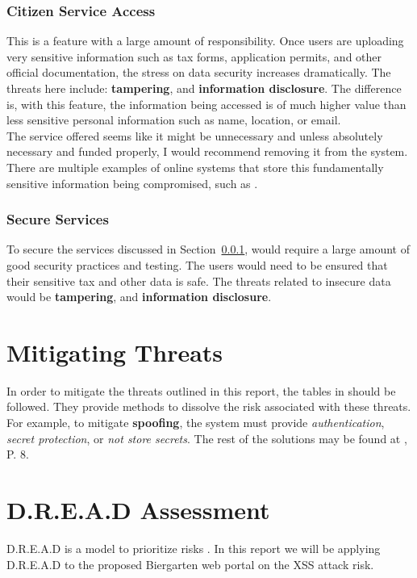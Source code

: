 \documentclass{article}
\numberwithin{equation}{section} %
\numberwithin{figure}{section} %
\numberwithin{table}{section} %
\begin{document}
\subsubsection{Citizen Service Access}
\label{sec:services}
This is a feature with a large amount of responsibility.  Once users are uploading very sensitive information such as tax forms, application permits, and other official documentation, the stress on data security increases dramatically.  The threats here include: \textbf{tampering}, and \textbf{information disclosure}.  The difference is, with this feature, the information being accessed is of much higher value than less sensitive personal information such as name, location, or email.  \\

The service offered seems like it might be unnecessary and unless absolutely necessary and funded properly, I would recommend removing it from the system.  There are multiple examples of online systems that store this fundamentally sensitive information being compromised, such as \cite{stolentax}.

\subsubsection{Secure Services}
To secure the services discussed in Section~\ref{sec:services}, would require a large amount of good security practices and testing.  The users would need to be ensured that their sensitive tax and other data is safe.  The threats related to insecure data would be \textbf{tampering}, and \textbf{information disclosure}.

\section{Mitigating Threats}
In order to mitigate the threats outlined in this report, the tables in \cite{spec} should be followed.  They provide methods to dissolve the risk associated with these threats. For example, to mitigate \textbf{spoofing}, the system must provide \textit{authentication}, \textit{secret protection}, or \textit{not store secrets}.  The rest of the solutions may be found at \cite{spec}, P. 8.

\section{D.R.E.A.D Assessment}
D.R.E.A.D is a model to prioritize risks \cite{owaspdread}.  In this report we will be applying D.R.E.A.D to the proposed Biergarten web portal on the XSS attack risk. 
\end{document}
